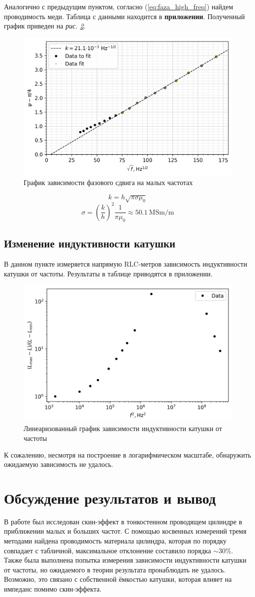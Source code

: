 \documentclass[12pt, a4paper]{article}
\begin{document}
Аналогично с предыдущим пунктом, согласно (\ref{eq:faza_high_freq}) найдем проводимость меди.
Таблица с данными находится в \textbf{приложении}. Полученный график приведен на \textit{рис. \ref{fig:plot_high_freq}}.
\begin{figure}[H]
  \centering
  \includegraphics[width=0.6\linewidth]{pics/res9.png}
  \caption{График зависимости фазового сдвига на малых частотах}
  \label{fig:plot_high_freq}
\end{figure}
\[k = h\sqrt{\pi \sigma \mu_0}\]
\[\sigma = \left( \frac{k}{h} \right)^2 \frac{1}{\pi \mu_0} \approx 50.1~\mathrm{MSm/m}\]

\subsection{Изменение индуктивности катушки}
В данном пункте измеряется напрямую RLC-метров зависимость индуктивности катушки от частоты.
Результаты в таблице приводятся в приложении.
\begin{figure}[H]
  \centering
  \includegraphics[width=0.6\linewidth]{pics/psi(sqrtf).png}
  \caption{Линеаризованный график зависимости индуктивности катушки от частоты}
  \label{fig:plot_high_freq}
\end{figure}

К сожалению, несмотря на построение в логарифмическом масштабе, обнаружить ожидаемую зависимость не удалось.
\section{Обсуждение результатов и вывод}
В работе был исследован скин-эффект в тонкостенном проводящем цилиндре в приближении малых и больших частот. С помощью косвенных измерений тремя методами найдена проводимость материала цилиндра, которая по порядку совпадает с табличной, максимальное отклонение составило порядка $\sim 30\%$.
Также была выполнена попытка измерения зависимости индуктивности катушки от частоты, но ожидаемого в теории результата пронаблюдать не удалось. Возможно, это связано с собственной ёмкостью катушки, которая влияет на импеданс помимо скин-эффекта.
\end{document}
